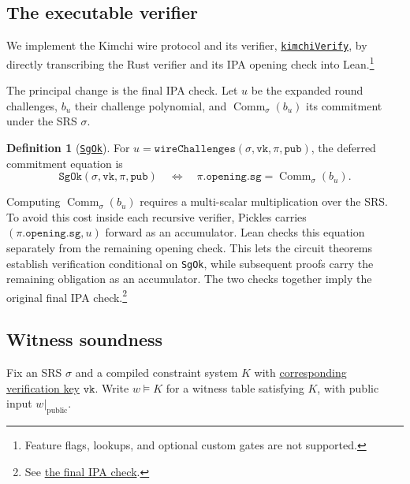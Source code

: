 \documentclass[11pt,a4paper]{article}
\newcommand{\inlinecode}[1]{\mbox{\texttt{#1}}}
\newcommand{\restrict}[2]{\left.#1\right\rvert_{#2}}
\theoremstyle{definition}
\theoremstyle{insetstatement}
\newtheorem{definitiontext}[example]{Definition}
\newenvironment{statementblock}
  {\begin{list}{}{%
    \setlength{\leftmargin}{0pt}%
    \setlength{\rightmargin}{0pt}%
    \setlength{\labelwidth}{0pt}%
    \setlength{\labelsep}{0pt}%
    \setlength{\itemindent}{0pt}%
    \setlength{\listparindent}{0pt}%
    \setlength{\topsep}{.7\baselineskip plus 2pt minus 1pt}%
    \setlength{\partopsep}{0pt}%
    \setlength{\parsep}{0pt}%
    \setlength{\itemsep}{0pt}}%
    \item\relax}
  {\end{list}}
\newenvironment{definition}[1][]
  {\begin{statementblock}\begin{definitiontext}[{#1}]}
  {\end{definitiontext}\end{statementblock}}
\begin{document}
\subsection{The executable verifier}
\label{sec:wire-verifier}

We implement the Kimchi wire protocol and its verifier,
\href{https://github.com/l-adic/snarky/blob/main/formal/kimchi/Kimchi/Verifier/Kimchi.lean\#L957}{\inlinecode{kimchiVerify}},
by directly transcribing the Rust verifier and its IPA opening check into
Lean.\footnote{Feature flags, lookups, and optional custom gates are not supported.}

The principal change is the final IPA check. Let $u$ be the expanded round
challenges, $b_u$ their challenge polynomial, and
$\operatorname{Comm}_\sigma(b_u)$ its commitment under the SRS $\sigma$.

\begin{definition}[\href{https://github.com/l-adic/snarky/blob/main/formal/kimchi/Kimchi/Verifier/Accumulator.lean\#L25}{\inlinecode{SgOk}}]
\label{def:sg-ok}
For $u=\mathtt{wireChallenges}(\sigma,\mathtt{vk},\pi,\mathtt{pub})$, the
deferred commitment equation is
\[
  \mathtt{SgOk}(\sigma,\mathtt{vk},\pi,\mathtt{pub})
  \quad\Longleftrightarrow\quad
  \pi.\mathtt{opening.sg}=\operatorname{Comm}_\sigma(b_u).
\]
\end{definition}

Computing $\operatorname{Comm}_\sigma(b_u)$ requires a multi-scalar
multiplication over the SRS. To avoid this cost inside each recursive
verifier, Pickles carries $(\pi.\mathtt{opening.sg},u)$ forward as an
accumulator. Lean checks this equation separately from the remaining
opening check. This lets the circuit theorems establish verification
conditional on \inlinecode{SgOk}, while subsequent proofs carry the remaining
obligation as an accumulator. The two checks together imply the original final IPA
check.\footnote{See
  \href{https://github.com/l-adic/snarky/blob/main/formal/bulletproof-pcs/Bulletproof/Wire.lean\#L555-L570}{the final IPA check}.}

\subsection{Witness soundness}
\label{sec:kimchi-failure}

Fix an SRS $\sigma$ and a compiled constraint system $K$ with
\href{https://github.com/l-adic/snarky/blob/main/formal/kimchi/Kimchi/KeyDerivation.lean\#L120}{corresponding verification key}
$\mathtt{vk}$.
Write $w\models K$ for a witness table satisfying $K$, with public input
$\restrict{w}{\mathrm{public}}$.
\end{document}

